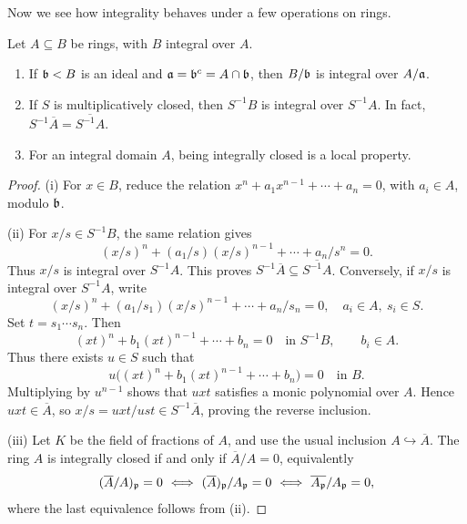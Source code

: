 \documentclass[11pt,a4paper]{article}
\begin{document}
Now we see how integrality behaves under a few operations on rings.
\setcounter{theorem}{22}\begin{proposition}
Let $A\subseteq B$ be rings, with $B$ integral over $A$.
\begin{enumerate}[label=(\roman*)]
\setcounter{enumi}{0}\item If $\bb<B$ is an ideal and $\aa=\bb^c=A\cap\bb$, then $B/\bb$ is integral over $A/\aa$.
\setcounter{enumi}{1}\item If $S$ is multiplicatively closed, then $S^{-1}B$ is integral over $S^{-1}A$. In fact, $S^{-1}\overline A=\overline{S^{-1}A}$.
\setcounter{enumi}{2}\item For an integral domain $A$, being integrally closed is a local property.
\end{enumerate}
\end{proposition}
\begin{proof}
(i) For $x\in B$, reduce the relation $x^n+a_1x^{n-1}+\cdots+a_n=0$, with $a_i\in A$, modulo $\bb$.

(ii) For $x/s\in S^{-1}B$, the same relation gives
\[
(x/s)^n+(a_1/s)(x/s)^{n-1}+\cdots+a_n/s^n=0.
\]
Thus $x/s$ is integral over $S^{-1}A$. This proves $S^{-1}\overline A\subseteq\overline{S^{-1}A}$. Conversely, if $x/s$ is integral over $S^{-1}A$, write
\[
(x/s)^n+(a_1/s_1)(x/s)^{n-1}+\cdots+a_n/s_n=0,
\quad a_i\in A,\ s_i\in S.
\]
Set $t=s_1\cdots s_n$. Then
\[
(xt)^n+b_1(xt)^{n-1}+\cdots+b_n=0\quad\text{in }S^{-1}B,\qquad b_i\in A.
\]
Thus there exists $u\in S$ such that
\[
u\big((xt)^n+b_1(xt)^{n-1}+\cdots+b_n\big)=0\quad\text{in }B.
\]
Multiplying by $u^{n-1}$ shows that $uxt$ satisfies a monic polynomial over $A$. Hence $uxt\in\overline A$, so $x/s=uxt/ust\in S^{-1}\overline A$, proving the reverse inclusion.

(iii) Let $K$ be the field of fractions of $A$, and use the usual inclusion $A\hookrightarrow\overline A$. The ring $A$ is integrally closed if and only if $\overline A/A=0$, equivalently
\[
(\overline A/A)_{\pp}=0
\ \Longleftrightarrow\ (\overline A)_{\pp}/A_{\pp}=0
\ \Longleftrightarrow\ \overline{A_{\pp}}/A_{\pp}=0,
\]
where the last equivalence follows from (ii).
\end{proof}
\end{document}
